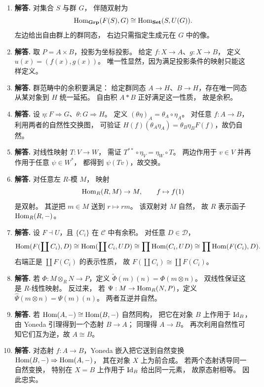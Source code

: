 \begin{enumerate}[label=\textbf{A.\arabic*.}, leftmargin=*, itemsep=1em]
\item \textbf{解答.} 对集合 $S$ 与群 $G$，
伴随双射为
\[
\mathrm{Hom}_{\mathbf{Grp}}(F(S),G)\cong \mathrm{Hom}_{\mathbf{Set}}(S,U(G)).
\]
左边给出自由群上的群同态，
右边只需指定生成元在 $G$ 中的像。

\item \textbf{解答.} 取 $P=A\times B$，投影为坐标投影。
给定 $f:X\to A$、$g:X\to B$，
定义 $u(x)=(f(x),g(x))$。
唯一性显然，因为满足投影条件的映射只能这样定义。

\item \textbf{解答.} 群范畴中的余积要满足：
给定群同态 $A\to H$、$B\to H$，存在唯一同态从某对象到 $H$ 统一延拓。
自由积 $A*B$ 正好满足这一性质，
故是余积。

\item \textbf{解答.} 设 $\eta:F\Rightarrow G$、$\theta:G\Rightarrow H$。
定义 $(\theta\eta)_A=\theta_A\circ\eta_A$。
对任意 $f:A\to B$，
利用两者的自然性交换图，
可验证
$H(f)(\theta_A\eta_A)=\theta_B\eta_BF(f)$，故仍自然。

\item \textbf{解答.} 对线性映射 $T:V\to W$，
需证
$T^{**}\circ \eta_V=\eta_W\circ T$。
两边作用于 $v\in V$ 并再作用于任意 $\psi\in W^*$，
都得到 $\psi(Tv)$，故交换。

\item \textbf{解答.} 对任意左 $R$-模 $M$，
映射
\[
\mathrm{Hom}_R(R,M)\to M,
\qquad f\mapsto f(1)
\]
是双射。
其逆把 $m\in M$ 送到 $r\mapsto rm$。
该双射对 $M$ 自然，
故 $R$ 表示函子 $\mathrm{Hom}_R(R,-)$。

\item \textbf{解答.} 设 $F\dashv U$，且 $\{C_i\}$ 在 $\mathcal{C}$ 中有余积。
对任意 $D\in\mathcal{D}$，
\[
\mathrm{Hom}(F(\coprod C_i),D)
\cong \mathrm{Hom}(\coprod C_i,UD)
\cong \prod \mathrm{Hom}(C_i,UD)
\cong \prod \mathrm{Hom}(F(C_i),D).
\]
右端正是 $\coprod F(C_i)$ 的表示性质，
故 $F(\coprod C_i)\cong \coprod F(C_i)$。

\item \textbf{解答.} 若 $\Phi:M\otimes_R N\to P$，定义
$\widetilde\Phi(m)(n)=\Phi(m\otimes n)$。
双线性保证这是 $R$-线性映射。
反过来，
若 $\Psi:M\to\mathrm{Hom}_R(N,P)$，定义
$\widehat\Psi(m\otimes n)=\Psi(m)(n)$。
两者互逆并自然。

\item \textbf{解答.} 若
$\mathrm{Hom}(A,-)\cong \mathrm{Hom}(B,-)$ 自然同构，
把它在对象 $B$ 上作用于 $\mathrm{Id}_B$，由 Yoneda 引理得到一个态射 $B\to A$；
同理得 $A\to B$。
再次利用自然性可知它们互为逆，故 $A\cong B$。

\item \textbf{解答.} 对态射 $f:A\to B$，Yoneda 嵌入把它送到自然变换
$\mathrm{Hom}(B,-)\Rightarrow \mathrm{Hom}(A,-)$，
其在对象 $X$ 上为前合成。
若两个态射诱导同一自然变换，
特别在 $X=B$ 上作用于 $\mathrm{Id}_B$ 给出同一元素，
故原态射相等。
因此忠实。


\end{enumerate}
